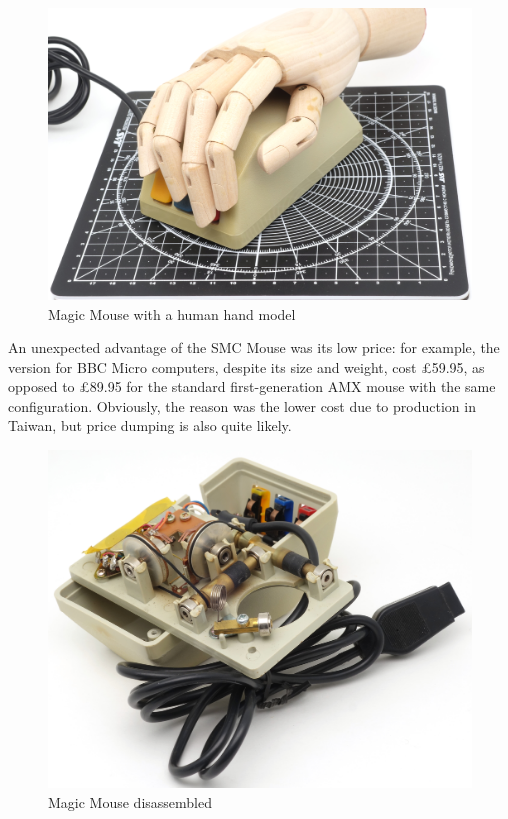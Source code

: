 \documentclass[11pt, a4paper]{article}
\begin{document}
\begin{figure}[h]
    \centering
    \includegraphics[scale=0.54]{1985_smc_contriver_magic_mouse/hand_30.jpg}
    \caption{Magic Mouse with a human hand model}
    \label{fig:MagicMouseHand}
\end{figure}

An unexpected advantage of the SMC Mouse was its low price: for example, the version for BBC Micro computers, despite its size and weight, cost \pounds 59.95, as opposed to \pounds 89.95 for the standard first-generation AMX mouse with the same configuration. Obviously, the reason was the lower cost due to production in Taiwan, but price dumping is also quite likely.

 \begin{figure}[h]
    \centering
    \includegraphics[scale=0.65]{1985_smc_contriver_magic_mouse/inside_30.jpg}
    \caption{Magic Mouse disassembled}
    \label{fig:MagicMouseInside}
\end{figure}
\end{document}
